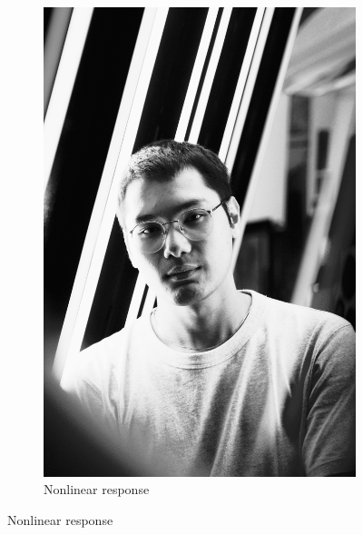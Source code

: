 \documentclass[12pt,a4paper]{article}
\begin{document}
\begin{figure}[htb]
\begin{subfigure}[h!]{0.24\textwidth}
		\includegraphics[width=\textwidth]{adapt_eq.png}
		\caption{Nonlinear response}
		\label{fig:adapt-eq}
	\end{subfigure}
	

\end{figure}
\end{document}
